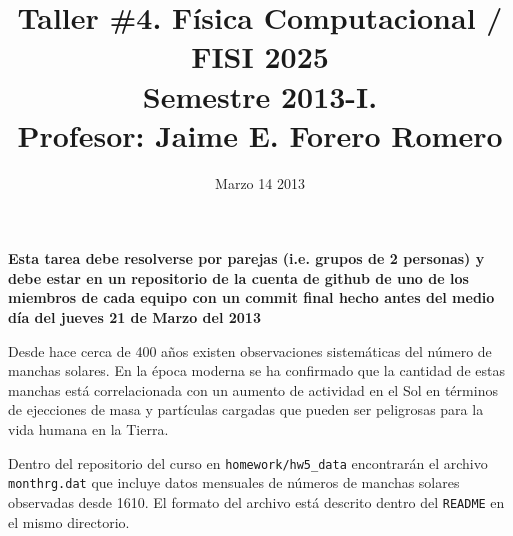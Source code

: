 \documentclass{article}
\title{Taller \#4. F\'isica Computacional / FISI 2025 \\Semestre
  2013-I. \\ Profesor: Jaime E. Forero Romero}
\date{Marzo 14 2013}
\begin{document}
\maketitle

{\bf Esta tarea debe resolverse por parejas (i.e. grupos de 2
  personas) y debe estar en un repositorio de la cuenta de github de
  uno de los miembros de cada equipo con un commit final hecho antes del
  medio d\'ia del jueves 21 de Marzo del 2013}  

Desde hace cerca de 400 a\~nos existen observaciones sistem\'aticas del
n\'umero de manchas solares. En la \'epoca moderna se ha confirmado
que la cantidad de estas manchas est\'a correlacionada con un aumento
de actividad en el Sol en t\'erminos de ejecciones de masa y
part\'iculas cargadas que pueden ser peligrosas para la vida humana en
la Tierra.

Dentro del repositorio del curso en \verb"homework/hw5_data"
encontrar\'an el archivo \verb"monthrg.dat" que incluye datos
mensuales de n\'umeros de manchas solares observadas desde 1610. El
formato del archivo est\'a descrito dentro del \verb"README" en el
mismo directorio.
\end{document}
